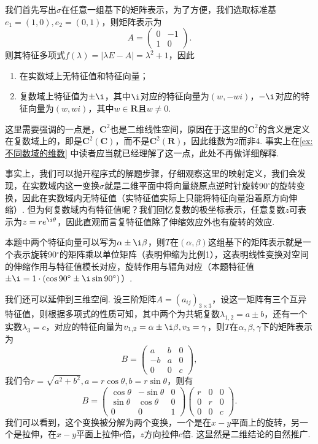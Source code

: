 \begin{solution}
    我们首先写出$\sigma$在任意一组基下的矩阵表示，为了方便，我们选取标准基$e_1=(1,0),e_2=(0,1)$，则矩阵表示为
    \[ A=\begin{pmatrix}
            0 & -1 \\ 1 & 0
        \end{pmatrix}. \]
    则其特征多项式$f(\lambda)=|\lambda E-A|=\lambda^2+1$，因此
    \begin{enumerate}
        \item 在实数域上无特征值和特征向量；

        \item 复数域上特征值为$\pm\i$，其中$\i$对应的特征向量为$(w,-wi)$，$-\i$对应的特征向量为$(w,wi)$，其中$w\in\mathbf{R}$且$w\neq 0$.
    \end{enumerate}
\end{solution}

这里需要强调的一点是，$\mathbf{C}^2$也是二维线性空间，原因在于这里的$\mathbf{C}^2$的含义是定义在复数域上的，即是$\mathbf{C}^2(\mathbf{C})$，而不是$\mathbf{C}^2(\mathbf{R})$，因此维数为2而非4. 事实上在\autoref{ex:不同数域的维数} 中读者应当就已经理解了这一点，此处不再做详细解释.

事实上，我们可以抛开程序式的解题步骤，仔细观察这里的映射定义，我们会发现，在实数域内这一变换$\sigma$就是二维平面中将向量绕原点逆时针旋转90$^\circ$的旋转变换，因此在实数域内无特征值（实特征值实际上只能将特征向量沿着原方向伸缩）. 但为何复数域内有特征值呢？我们回忆复数的极坐标表示，任意复数$z$可表示为$z=re^{\i\theta}$，因此直观而言复特征值除了伸缩效应外也有旋转的效应.

本题中两个特征向量可以写为$\alpha\pm \i\beta$，则$T$在$(\alpha,\beta)$这组基下的矩阵表示就是一个表示旋转90$^\circ$的矩阵乘以单位矩阵（表明伸缩为比例1），这表明线性变换对空间的伸缩作用与特征值模长对应，旋转作用与辐角对应（本题特征值$\pm \i=1\cdot(\cos 90^\circ\pm \i\sin 90^\circ)$）.

我们还可以延伸到三维空间. 设三阶矩阵$A=(a_{ij})_{3\times 3}$，设这一矩阵有三个互异特征值，则根据多项式的性质可知，其中两个为共轭复数$\lambda_{1,2}=a\pm b$，还有一个实数$\lambda_3=c$，对应的特征向量为$v_{1,2}=\alpha\pm \i\beta,v_3=\gamma$，则$T$在$\alpha,\beta,\gamma$下的矩阵表示为
\[ B=\begin{pmatrix}
        a & b & 0 \\ -b & a & 0 \\ 0 & 0 & c
    \end{pmatrix}, \]
我们令$r=\sqrt{a^2+b^2},a=r\cos\theta,b=r\sin\theta$，则有
\[ B=\begin{pmatrix}
        \cos\theta & -\sin\theta & 0 \\ \sin\theta & \cos\theta & 0 \\ 0 & 0 & 1
    \end{pmatrix}\begin{pmatrix}
        r & 0 & 0 \\ 0 & r & 0 \\ 0 & 0 & c
    \end{pmatrix}. \]
我们可以看到，这个变换被分解为两个变换，一个是在$x-y$平面上的旋转，另一个是拉伸，在$x-y$平面上拉伸$r$倍，$z$方向拉伸$c$倍. 这显然是二维结论的自然推广.


